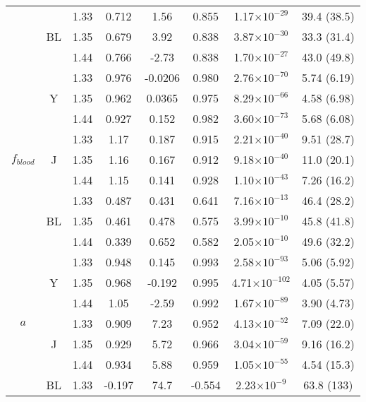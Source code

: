 \begin{subappendices}
\begin{table}[htb!]
\begin{tabular}{|ccc|ccccc|}
        \cline{2-8}
        & \multirow{3}{*}{BL} & 1.33 & 0.712 & 1.56 & 0.855 & 1.17$\times 10^{-29}$ & 39.4 (38.5) \\
        & & 1.35 & 0.679 & 3.92 & 0.838 & 3.87$\times 10^{-30}$ & 33.3 (31.4) \\
        & & 1.44 & 0.766 & -2.73 & 0.838 & 1.70$\times 10^{-27}$ & 43.0 (49.8) \\
        \hline
        \multirow{9}{*}{$f_{blood}$} & \multirow{3}{*}{Y} & 1.33 & 0.976 & -0.0206 & 0.980 & 2.76$\times 10^{-70}$ & 5.74 (6.19) \\
        & & 1.35 & 0.962 & 0.0365 & 0.975 & 8.29$\times 10^{-66}$ & 4.58 (6.98) \\
        & & 1.44 & 0.927 & 0.152 & 0.982 & 3.60$\times 10^{-73}$ & 5.68 (6.08) \\
        \cline{2-8}
        & \multirow{3}{*}{J} & 1.33 & 1.17 & 0.187 & 0.915 & 2.21$\times 10^{-40}$ & 9.51 (28.7) \\
        & & 1.35 & 1.16 & 0.167 & 0.912 & 9.18$\times 10^{-40}$ & 11.0 (20.1) \\
        & & 1.44 & 1.15 & 0.141 & 0.928 & 1.10$\times 10^{-43}$ & 7.26 (16.2) \\
        \cline{2-8}
        & \multirow{3}{*}{BL} & 1.33 & 0.487 & 0.431 & 0.641 & 7.16$\times 10^{-13}$ & 46.4 (28.2) \\
        & & 1.35 & 0.461 & 0.478 & 0.575 & 3.99$\times 10^{-10}$ & 45.8 (41.8) \\
        & & 1.44 & 0.339 & 0.652 & 0.582 & 2.05$\times 10^{-10}$ & 49.6 (32.2) \\
        \hline
        \multirow{9}{*}{$a$} & \multirow{3}{*}{Y} & 1.33 & 0.948 & 0.145 & 0.993 & 2.58$\times 10^{-93}$ & 5.06 (5.92) \\
        & & 1.35 & 0.968 & -0.192 & 0.995 & 4.71$\times 10^{-102}$ & 4.05 (5.57) \\
        & & 1.44 & 1.05 & -2.59 & 0.992 & 1.67$\times 10^{-89}$ & 3.90 (4.73) \\
        \cline{2-8}
        & \multirow{3}{*}{J} & 1.33 & 0.909 & 7.23 & 0.952 & 4.13$\times 10^{-52}$ & 7.09 (22.0) \\
        & & 1.35 & 0.929 & 5.72 & 0.966 & 3.04$\times 10^{-59}$ & 9.16 (16.2) \\
        & & 1.44 & 0.934 & 5.88 & 0.959 & 1.05$\times 10^{-55}$ & 4.54 (15.3) \\
        \cline{2-8}
        & \multirow{3}{*}{BL} & 1.33 & -0.197 & 74.7 & -0.554 & 2.23$\times 10^{-9}$ & 63.8 (133) \\

\end{tabular}
\end{table}
\end{subappendices}
